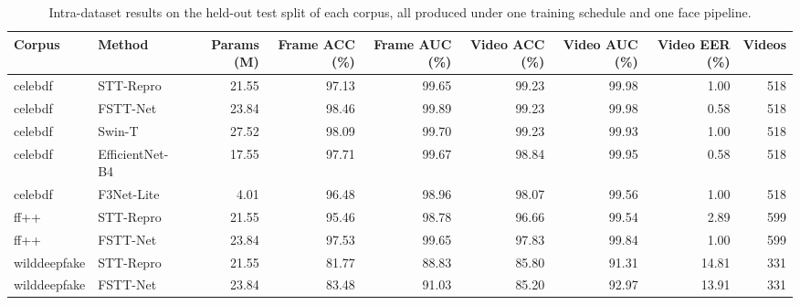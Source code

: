 \begin{table}[!t]
\centering
\caption{Intra-dataset results on the held-out test split of each corpus, all produced under one training schedule and one face pipeline.}
\label{tab:tableII_intra_dataset}
\footnotesize
\begin{tabular}{llrrrrrrr}
\hline\hline
Corpus & Method & Params (M) & Frame ACC (\%) & Frame AUC (\%) & Video ACC (\%) & Video AUC (\%) & Video EER (\%) & Videos \\
\hline
celebdf & STT-Repro & 21.55 & 97.13 & 99.65 & 99.23 & 99.98 & 1.00 & 518 \\
celebdf & FSTT-Net & 23.84 & 98.46 & 99.89 & 99.23 & 99.98 & 0.58 & 518 \\
celebdf & Swin-T & 27.52 & 98.09 & 99.70 & 99.23 & 99.93 & 1.00 & 518 \\
celebdf & EfficientNet-B4 & 17.55 & 97.71 & 99.67 & 98.84 & 99.95 & 0.58 & 518 \\
celebdf & F3Net-Lite & 4.01 & 96.48 & 98.96 & 98.07 & 99.56 & 1.00 & 518 \\
ff++ & STT-Repro & 21.55 & 95.46 & 98.78 & 96.66 & 99.54 & 2.89 & 599 \\
ff++ & FSTT-Net & 23.84 & 97.53 & 99.65 & 97.83 & 99.84 & 1.00 & 599 \\
wilddeepfake & STT-Repro & 21.55 & 81.77 & 88.83 & 85.80 & 91.31 & 14.81 & 331 \\
wilddeepfake & FSTT-Net & 23.84 & 83.48 & 91.03 & 85.20 & 92.97 & 13.91 & 331 \\
\hline\hline
\end{tabular}
\end{table}
